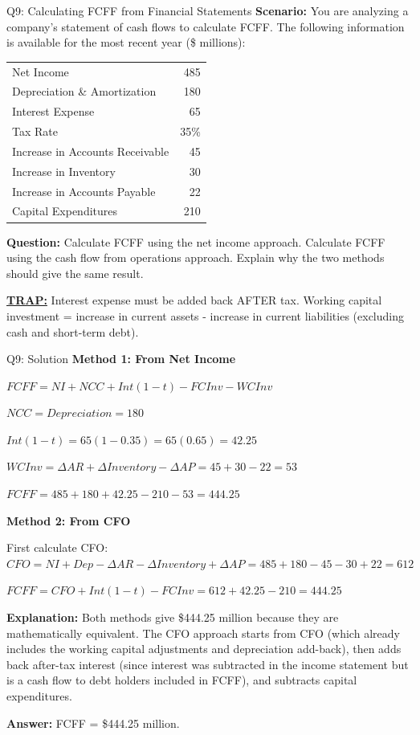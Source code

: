 \documentclass{beamer}
\renewcommand{\scriptsize}{\fontsize{6pt}{7pt}\selectfont}
\begin{document}
	\begin{frame}{Q9: Calculating FCFF from Financial Statements}
		\scriptsize
		\textbf{Scenario:} You are analyzing a company's statement of cash flows to calculate FCFF. The following information is available for the most recent year (\$ millions):
		
		\begin{tabular}{lr}
			Net Income & 485 \\
			Depreciation \& Amortization & 180 \\
			Interest Expense & 65 \\
			Tax Rate & 35\% \\
			Increase in Accounts Receivable & 45 \\
			Increase in Inventory & 30 \\
			Increase in Accounts Payable & 22 \\
			Capital Expenditures & 210 \\
		\end{tabular}
		
		\textbf{Question:} Calculate FCFF using the net income approach. Calculate FCFF using the cash flow from operations approach. Explain why the two methods should give the same result.
		
		\vspace{2pt}
		\underline{\textbf{TRAP:}} Interest expense must be added back AFTER tax. Working capital investment = increase in current assets - increase in current liabilities (excluding cash and short-term debt).
	\end{frame}
	
	\begin{frame}{Q9: Solution}
		\scriptsize
		\textbf{Method 1: From Net Income}
		
		$FCFF = NI + NCC + Int(1-t) - FCInv - WCInv$
		
		$NCC = Depreciation = 180$
		
		$Int(1-t) = 65(1-0.35) = 65(0.65) = 42.25$
		
		$WCInv = \Delta AR + \Delta Inventory - \Delta AP = 45 + 30 - 22 = 53$
		
		$FCFF = 485 + 180 + 42.25 - 210 - 53 = 444.25$
		
		\vspace{2pt}
		\textbf{Method 2: From CFO}
		
		First calculate CFO:
		$CFO = NI + Dep - \Delta AR - \Delta Inventory + \Delta AP = 485 + 180 - 45 - 30 + 22 = 612$
		
		$FCFF = CFO + Int(1-t) - FCInv = 612 + 42.25 - 210 = 444.25$
		
		\vspace{2pt}
		\textbf{Explanation:} Both methods give \$444.25 million because they are mathematically equivalent. The CFO approach starts from CFO (which already includes the working capital adjustments and depreciation add-back), then adds back after-tax interest (since interest was subtracted in the income statement but is a cash flow to debt holders included in FCFF), and subtracts capital expenditures.
		
		\textbf{Answer:} FCFF = \$444.25 million.
	\end{frame}
	
\end{document}
